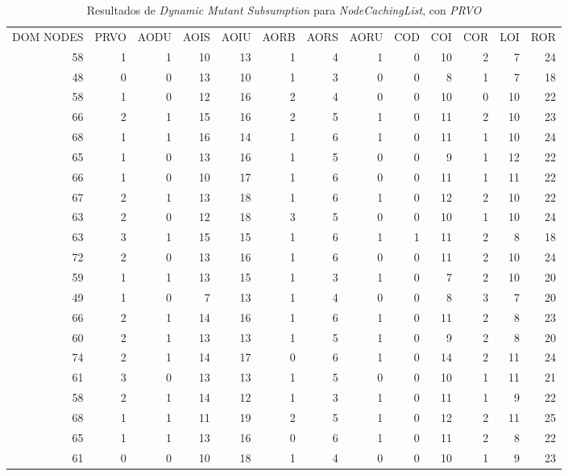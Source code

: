 \begin{table}[]
	\caption[\emph{Dynamic Mutant Subsumption} \emph{NodeCachingList}, con \emph{PRVO}]{Resultados de \emph{Dynamic Mutant Subsumption} para \emph{NodeCachingList}, con \emph{PRVO}}
	\label{tables.results.subsumption.ncll.prvo}
	\centering
	\scriptsize
	\def\arraystretch{0.95}
	\setlength\tabcolsep{0.5mm}
	\begin{tabular}{rrrrrrrrrrrrr}
	DOM NODES & PRVO & AODU & AOIS & AOIU & AORB & AORS & AORU & COD & COI & COR & LOI & ROR \\
	58 & 1 & 1 & 10 & 13 & 1 & 4 & 1 & 0 & 10 & 2 & 7 & 24 \\
	48 & 0 & 0 & 13 & 10 & 1 & 3 & 0 & 0 & 8 & 1 & 7 & 18 \\
	58 & 1 & 0 & 12 & 16 & 2 & 4 & 0 & 0 & 10 & 0 & 10 & 22 \\
	66 & 2 & 1 & 15 & 16 & 2 & 5 & 1 & 0 & 11 & 2 & 10 & 23 \\
	68 & 1 & 1 & 16 & 14 & 1 & 6 & 1 & 0 & 11 & 1 & 10 & 24 \\
	65 & 1 & 0 & 13 & 16 & 1 & 5 & 0 & 0 & 9 & 1 & 12 & 22 \\
	66 & 1 & 0 & 10 & 17 & 1 & 6 & 0 & 0 & 11 & 1 & 11 & 22 \\
	67 & 2 & 1 & 13 & 18 & 1 & 6 & 1 & 0 & 12 & 2 & 10 & 22 \\
	63 & 2 & 0 & 12 & 18 & 3 & 5 & 0 & 0 & 10 & 1 & 10 & 24 \\
	63 & 3 & 1 & 15 & 15 & 1 & 6 & 1 & 1 & 11 & 2 & 8 & 18 \\
	72 & 2 & 0 & 13 & 16 & 1 & 6 & 0 & 0 & 11 & 2 & 10 & 24 \\
	59 & 1 & 1 & 13 & 15 & 1 & 3 & 1 & 0 & 7 & 2 & 10 & 20 \\
	49 & 1 & 0 & 7 & 13 & 1 & 4 & 0 & 0 & 8 & 3 & 7 & 20 \\
	66 & 2 & 1 & 14 & 16 & 1 & 6 & 1 & 0 & 11 & 2 & 8 & 23 \\
	60 & 2 & 1 & 13 & 13 & 1 & 5 & 1 & 0 & 9 & 2 & 8 & 20 \\
	74 & 2 & 1 & 14 & 17 & 0 & 6 & 1 & 0 & 14 & 2 & 11 & 24 \\
	61 & 3 & 0 & 13 & 13 & 1 & 5 & 0 & 0 & 10 & 1 & 11 & 21 \\
	58 & 2 & 1 & 14 & 12 & 1 & 3 & 1 & 0 & 11 & 1 & 9 & 22 \\
	68 & 1 & 1 & 11 & 19 & 2 & 5 & 1 & 0 & 12 & 2 & 11 & 25 \\
	65 & 1 & 1 & 13 & 16 & 0 & 6 & 1 & 0 & 11 & 2 & 8 & 22 \\
	61 & 0 & 0 & 10 & 18 & 1 & 4 & 0 & 0 & 10 & 1 & 9 & 23 \\

\end{tabular}
\end{table}
